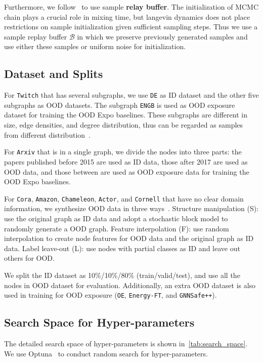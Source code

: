 Furthermore, we follow~\citep{du2019implicit} to use sample \textbf{relay buffer}. 
The initialization of MCMC chain plays a crucial role in mixing time, but langevin dynamics does not place restrictions on sample initialization given sufficient sampling steps. 
Thus we use a sample replay buffer $\mathcal{B}$ in which we preserve previously generated samples and use either these samples or uniform noise for initialization. 



\subsection{Dataset and Splits}
\label{app:dataset_and_split}

For \texttt{Twitch} that has several subgraphs, we use \texttt{DE} as ID dataset and the other five subgraphs as OOD datasets. The subgraph \texttt{ENGB} is used as OOD exposure dataset for training the OOD Expo baselines. These subgraphs are different in size, edge densities, and degree distribution, thus can be regarded as samples from different distribution~\citep{wu2021handling}. 

For \texttt{Arxiv} that is in a single graph, we divide the nodes into three parts: the papers published before 2015 are used as ID data, those after 2017 are used as OOD data, and those between are used as OOD exposure data for training the OOD Expo baselines. 

For \texttt{Cora}, \texttt{Amazon}, \texttt{Chameleon}, \texttt{Actor}, and \texttt{Cornell} that have no clear domain information, we synthesize OOD data in three ways~\citep{wu2022energy}. 
Structure manipulation (S): use the original graph as ID data and adopt a stochastic block model to randomly generate a OOD graph. 
Feature interpolation (F): use random interpolation to create node features for OOD data and the original graph as ID data. 
Label leave-out (L): use nodes with partial classes as ID and leave out others for OOD.

We split the ID dataset as 10\%/10\%/80\% (train/valid/test), and use all the nodes in OOD dataset for evaluation. Additionally, an extra OOD dataset is also used in training for OOD exposure (\texttt{OE}, \texttt{Energy-FT}, and \texttt{GNNSafe++}).

\subsection{Search Space for Hyper-parameters}
\label{sec:search_space}
The detailed search space of hyper-parameters is shown in~\cref{tab:search_space}. We use Optuna~\citep{akiba2019optuna} to conduct random search for hyper-parameters.

